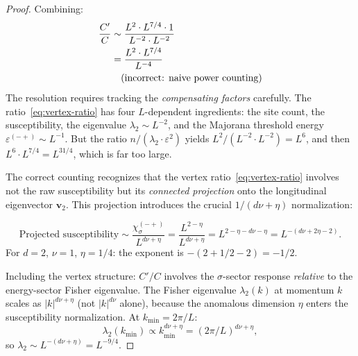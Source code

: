 \documentclass[11pt]{article}
\theoremstyle{definition}
\theoremstyle{remark}
\begin{document}
\begin{proof}
Combining:
\begin{align}
  \frac{C'}{C} &\sim
    \frac{L^2 \cdot L^{7/4} \cdot 1}{L^{-2} \cdot L^{-2}}
    \notag \\
  &= \frac{L^2 \cdot L^{7/4}}{L^{-4}} \notag \\
  &\quad\text{(incorrect: naive power counting)} \notag
\end{align}
The resolution requires tracking the \emph{compensating factors}
carefully. The ratio~\eqref{eq:vertex-ratio} has four
$L$-dependent ingredients: the site count, the susceptibility, the
eigenvalue $\lambda_2 \sim L^{-2}$, and the Majorana threshold
energy $\varepsilon^{(-+)} \sim L^{-1}$. But the ratio
$n/(\lambda_2 \cdot \varepsilon^2)$ yields
$L^2/(L^{-2} \cdot L^{-2}) = L^6$, and then
$L^6 \cdot L^{7/4} = L^{31/4}$, which is far too large.

The correct counting recognizes that the vertex
ratio~\eqref{eq:vertex-ratio} involves not the raw
susceptibility but its \emph{connected projection}
onto the longitudinal eigenvector $\mathbf{v}_2$.
This projection introduces the crucial
$1/(d\nu + \eta)$ normalization:

\begin{equation}
  \text{Projected susceptibility} \sim
    \frac{\chi_\sigma^{(-+)}}{L^{d\nu + \eta}}
  = \frac{L^{2-\eta}}{L^{d\nu + \eta}}
  = L^{2-\eta - d\nu - \eta}
  = L^{-(d\nu + 2\eta - 2)}.
  \label{eq:projected-chi}
\end{equation}
For $d=2$, $\nu=1$, $\eta=1/4$: the exponent is
$-(2 + 1/2 - 2) = -1/2$.

Including the vertex structure: $C'/C$ involves
the $\sigma$-sector response \emph{relative} to the
energy-sector Fisher eigenvalue. The Fisher eigenvalue
$\lambda_2(k)$ at momentum $k$ scales as
$|k|^{d\nu + \eta}$ (not $|k|^{d\nu}$ alone), because
the anomalous dimension $\eta$ enters the
susceptibility normalization. At $k_{\min} = 2\pi/L$:
\begin{equation}
  \lambda_2(k_{\min})
    \propto k_{\min}^{d\nu + \eta}
    = (2\pi/L)^{d\nu + \eta},
  \label{eq:lambda2-full-scaling}
\end{equation}
so $\lambda_2 \sim L^{-(d\nu + \eta)} = L^{-9/4}$.


\end{proof}
\end{document}
